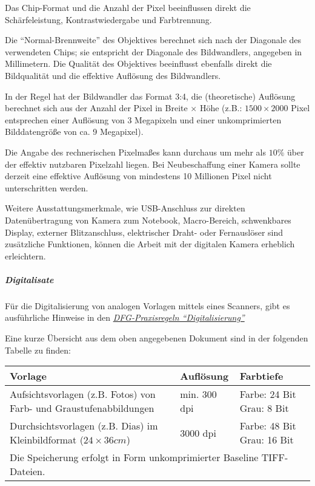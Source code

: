 Das Chip-Format und die Anzahl der Pixel beeinflussen direkt die Schärfeleistung, Kontrastwiedergabe und Farbtrennung.

Die "`Normal-Brennweite"' des Objektives berechnet sich nach der Diagonale des verwendeten Chips; sie entspricht der Diagonale des Bildwandlers, angegeben in Millimetern. Die Qualität des Objektives beeinflusst ebenfalls direkt die Bildqualität und die effektive Auflösung des Bildwandlers.

In der Regel hat der Bildwandler das Format 3:4, die (theoretische) Auflösung berechnet sich aus der Anzahl der Pixel in Breite $\times$ Höhe (z.B.: $1500\times 2000$ Pixel entsprechen einer Auflösung von 3 Megapixeln und einer unkomprimierten Bilddatengröße von ca. 9 Megapixel).

Die Angabe des rechnerischen Pixelmaßes kann durchaus um mehr als $10\%$ über der effektiv nutzbaren Pixelzahl liegen. Bei Neubeschaffung einer Kamera sollte derzeit eine effektive Auflösung von mindestens 10 Millionen Pixel nicht unterschritten werden.

Weitere Ausstattungsmerkmale, wie USB-Anschluss zur direkten Datenübertragung von Kamera zum Notebook, Macro-Bereich, schwenkbares Display, externer Blitzanschluss, elektrischer Draht- oder Fernauslöser sind zusätzliche Funktionen, können die Arbeit mit der digitalen Kamera erheblich erleichtern.


\subparagraph{Digitalisate} \label{Digitalisate-Bilder} Für die Digitalisierung von analogen Vorlagen mittels eines Scanners, gibt es ausführliche Hinweise in den \href{http://www.dfg.de/download/pdf/foerderung/programme/lis/praxisregeln_digitalisierung_2013.pdf}{\emph{DFG-Praxisregeln "`Digitalisierung"'}}

Eine kurze Übersicht aus dem oben angegebenen Dokument sind in der folgenden Tabelle zu finden:

\begin{center}
	\begin{tabular}{p{} l p{}}
		\toprule
		Vorlage & Auflösung & Farbtiefe \\ \midrule
		Aufsichtsvorlagen (z.B. Fotos) von Farb- und Graustufenabbildungen & min. 300 dpi & Farbe: 24 Bit \newline Grau: 8 Bit \\
		Durchsichtsvorlagen (z.B. Dias) im Kleinbildformat ($24\times 36 cm$) & 3000 dpi & Farbe: 48 Bit \newline Grau: 16 Bit\\ \cmidrule(r){1-3}
		\multicolumn{3}{l}{Die Speicherung erfolgt in Form unkomprimierter Baseline TIFF-Dateien.} \\
		\bottomrule    
	\end{tabular}
\end{center}

